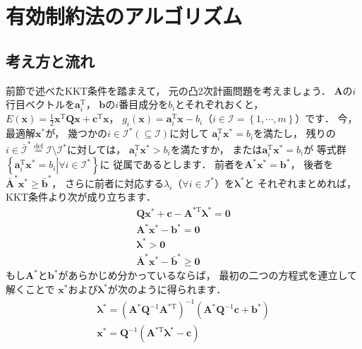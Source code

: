 ﻿\documentclass{jsarticle}
\begin{document}
\section{有効制約法のアルゴリズム}

\subsection{考え方と流れ}

前節で述べたKKT条件を踏まえて，
元の凸2次計画問題を考えましょう．
$\boldsymbol{A}$の$i$行目ベクトルを$\boldsymbol{a}_{i}^{\mathrm{T}}$，
$\boldsymbol{b}$の$i$番目成分を$b_{i}$とそれぞれおくと，
$E(\boldsymbol{x})=\frac{1}{2}\boldsymbol{x}^{\mathrm{T}}\boldsymbol{Q}\boldsymbol{x}+\boldsymbol{c}^{\mathrm{T}}\boldsymbol{x}$，
$g_{i}(\boldsymbol{x})=\boldsymbol{a}_{i}^{\mathrm{T}}\boldsymbol{x}-b_{i}$（$i\in\mathcal{I}=\left\{1,\cdots,m\right\}$）です．
今，最適解$\boldsymbol{x}^{*}$が，
幾つかの$i\in\mathcal{I}^{*}(\subseteq\mathcal{I})$に対して
$\boldsymbol{a}_{i}^{\mathrm{T}}\boldsymbol{x}^{*}=b_{i}$を満たし，
残りの$i\in\bar{\mathcal{I}}^{*}\overset{\mathrm{def}}{=}\mathcal{I}\setminus\mathcal{I}^{*}$に対しては，
$\boldsymbol{a}_{i}^{\mathrm{T}}\boldsymbol{x}^{*}>b_{i}$を満たすか，
または$\boldsymbol{a}_{i}^{\mathrm{T}}\boldsymbol{x}^{*}=b_{i}$が
等式群$\left\{\boldsymbol{a}_{i}^{\mathrm{T}}\boldsymbol{x}^{*}=b_{i}\left|\forall i\in\mathcal{I}^{*}\right.\right\}$に
従属であるとします．
前者を$\boldsymbol{A}^{*}\boldsymbol{x}^{*}=\boldsymbol{b}^{*}$，
後者を$\bar{\boldsymbol{A}}^{*}\boldsymbol{x}^{*}\geq\bar{\boldsymbol{b}}^{*}$，
さらに前者に対応する$\lambda_{i}$（$\forall i\in\mathcal{I}^{*}$）を$\boldsymbol{\lambda}^{*}$と
それぞれまとめれば，
KKT条件より次が成り立ちます．
\begin{align*}
\boldsymbol{Q}\boldsymbol{x}^{*}+\boldsymbol{c}
-\boldsymbol{A}^{*\mathrm{T}}\boldsymbol{\lambda}^{*}
=\boldsymbol{0}
\\
\boldsymbol{A}^{*}\boldsymbol{x}^{*}-\boldsymbol{b}^{*}=\boldsymbol{0}
\\
\boldsymbol{\lambda}^{*}>\boldsymbol{0}
\\
\bar{\boldsymbol{A}}^{*}\boldsymbol{x}^{*}-\bar{\boldsymbol{b}}^{*}\geq\boldsymbol{0}
\end{align*}
もし$\boldsymbol{A}^{*}$と$\boldsymbol{b}^{*}$があらかじめ分かっているならば，
最初の二つの方程式を連立して解くことで
$\boldsymbol{x}^{*}$および$\boldsymbol{\lambda}^{*}$が次のように得られます．
\begin{align*}
\boldsymbol{\lambda}^{*}
=
\left(\boldsymbol{A}^{*}\boldsymbol{Q}^{-1}\boldsymbol{A}^{*\mathrm{T}}\right)^{-1}
\left(
\boldsymbol{A}^{*}\boldsymbol{Q}^{-1}\boldsymbol{c}
+
\boldsymbol{b}^{*}
\right)
\\
\boldsymbol{x}^{*}
=
\boldsymbol{Q}^{-1}
\left(
\boldsymbol{A}^{*\mathrm{T}}\boldsymbol{\lambda}^{*}-\boldsymbol{c}
\right)
\end{align*}
\end{document}
